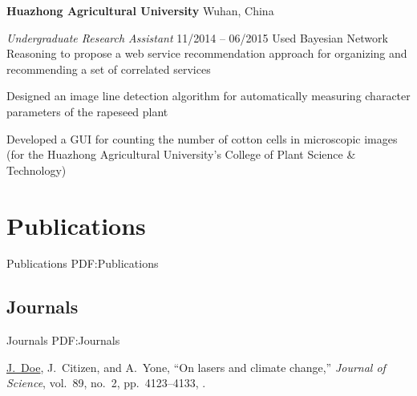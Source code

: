 \documentclass[letterpaper,10pt,oneside]{article}
\begin{document}
\begin{body}


\BigGap
{\textbf{Huazhong Agricultural University}}
\hfill
Wuhan, China

\emph{Undergraduate Research Assistant}
\hfill
11/2014 --
06/2015
\GapNoBreak
\BulletItem
Used Bayesian Network Reasoning to propose a web service recommendation approach for organizing and recommending a set of correlated services

\GapNoBreak
\BulletItem
Designed an image line detection algorithm for automatically measuring character parameters of the rapeseed plant

\GapNoBreak
\BulletItem
Developed a GUI for counting the number of cotton cells in microscopic images (for the Huazhong Agricultural University's College of Plant Science \& Technology)







\section
{Publications}
{Publications}
{PDF:Publications}

\iffalse
\subsection
{Journals}
{Journals}
{PDF:Journals}

\GapNoBreak
\NumberedItem{[11]}
{\underline{J.~Doe}, J.~Citizen, and A.~Yone,
``On lasers and climate change,''
\textit{Journal of Science},
vol.~89,
no.~2,
pp.~4123--4133,
.}


\end{body}
\end{document}
